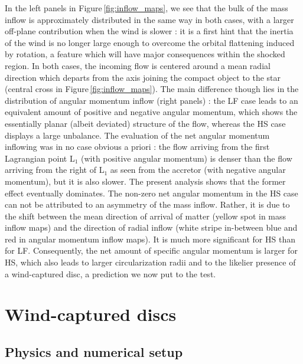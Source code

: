 \documentclass{aa}
\begin{document}
In the left panels in Figure\,\ref{fig:inflow_maps}, we see that the bulk of the mass inflow is approximately distributed in the same way in both cases, with a larger off-plane contribution when the wind is slower : it is a first hint that the inertia of the wind is no longer large enough to overcome the orbital flattening induced by rotation, a feature which will have major consequences within the shocked region. In both cases, the incoming flow is centered around a mean radial direction which departs from the axis joining the compact object to the star (central cross in Figure\,\ref{fig:inflow_maps}). The main difference though lies in the distribution of angular momentum inflow (right panels) : the LF case leads to an equivalent amount of positive and negative angular momentum, which shows the essentially planar (albeit deviated) structure of the flow, whereas the HS case displays a large unbalance. The evaluation of the net angular momentum inflowing was in no case obvious a priori : the flow arriving from the first Lagrangian point L$_1$ (with positive angular momentum) is denser than the flow arriving from the right of L$_1$ as seen from the accretor (with negative angular momentum), but it is also slower. The present analysis shows that the former effect eventually dominates. The non-zero net angular momentum in the HS case can not be attributed to an asymmetry of the mass inflow. Rather, it is due to the shift between the mean direction of arrival of matter (yellow spot in mass inflow maps) and the direction of radial inflow (white stripe in-between blue and red in angular momentum inflow maps). It is much more significant for HS than for LF. Consequently, the net amount of specific angular momentum is larger for HS, which also leads to larger circularization radii and to the likelier presence of a wind-captured disc, a prediction we now put to the test.

\section{Wind-captured discs}
\label{sec:wind-capt_discs}

\subsection{Physics and numerical setup}
\label{sec:HD}
\end{document}
